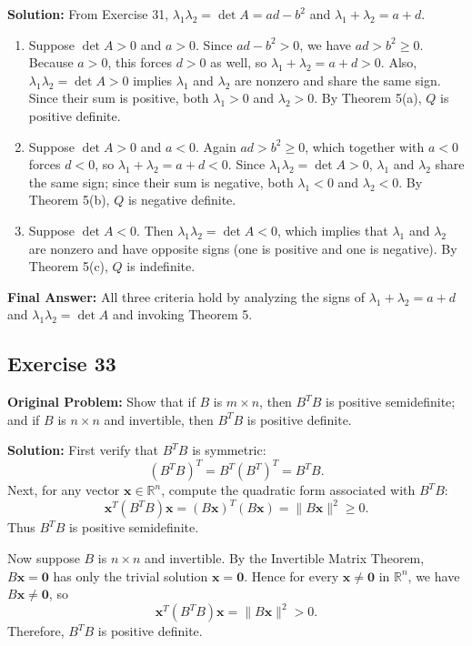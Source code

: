 \documentclass[11pt, letterpaper]{article}
\theoremstyle{definition}
\theoremstyle{remark}
\begin{document}
\textbf{Solution:}
From Exercise 31, $\lambda_1 \lambda_2 = \det A = ad - b^2$ and $\lambda_1 + \lambda_2 = a + d$.
\begin{enumerate}[label=\alph*.]
    \item Suppose $\det A > 0$ and $a > 0$. Since $ad - b^2 > 0$, we have $ad > b^2 \ge 0$. Because $a > 0$, this forces $d > 0$ as well, so $\lambda_1 + \lambda_2 = a + d > 0$. Also, $\lambda_1 \lambda_2 = \det A > 0$ implies $\lambda_1$ and $\lambda_2$ are nonzero and share the same sign. Since their sum is positive, both $\lambda_1 > 0$ and $\lambda_2 > 0$. By Theorem 5(a), $Q$ is positive definite.
    \item Suppose $\det A > 0$ and $a < 0$. Again $ad > b^2 \ge 0$, which together with $a < 0$ forces $d < 0$, so $\lambda_1 + \lambda_2 = a + d < 0$. Since $\lambda_1 \lambda_2 = \det A > 0$, $\lambda_1$ and $\lambda_2$ share the same sign; since their sum is negative, both $\lambda_1 < 0$ and $\lambda_2 < 0$. By Theorem 5(b), $Q$ is negative definite.
    \item Suppose $\det A < 0$. Then $\lambda_1 \lambda_2 = \det A < 0$, which implies that $\lambda_1$ and $\lambda_2$ are nonzero and have opposite signs (one is positive and one is negative). By Theorem 5(c), $Q$ is indefinite.
\end{enumerate}
\textbf{Final Answer:} All three criteria hold by analyzing the signs of $\lambda_1 + \lambda_2 = a+d$ and $\lambda_1\lambda_2 = \det A$ and invoking Theorem 5.

\hrulefill

\subsection*{Exercise 33}
\textbf{Original Problem:} Show that if $B$ is $m \times n$, then $B^T B$ is positive semidefinite; and if $B$ is $n \times n$ and invertible, then $B^T B$ is positive definite.

\textbf{Solution:}
First verify that $B^T B$ is symmetric:
\[
(B^T B)^T = B^T (B^T)^T = B^T B.
\]
Next, for any vector $\mathbf{x} \in \mathbb{R}^n$, compute the quadratic form associated with $B^T B$:
\[
\mathbf{x}^T (B^T B) \mathbf{x} = (B\mathbf{x})^T (B\mathbf{x}) = \|B\mathbf{x}\|^2 \ge 0.
\]
Thus $B^T B$ is positive semidefinite.

Now suppose $B$ is $n \times n$ and invertible. By the Invertible Matrix Theorem, $B\mathbf{x} = \mathbf{0}$ has only the trivial solution $\mathbf{x} = \mathbf{0}$. Hence for every $\mathbf{x} \ne \mathbf{0}$ in $\mathbb{R}^n$, we have $B\mathbf{x} \ne \mathbf{0}$, so
\[
\mathbf{x}^T (B^T B) \mathbf{x} = \|B\mathbf{x}\|^2 > 0.
\]
Therefore, $B^T B$ is positive definite.
\end{document}
